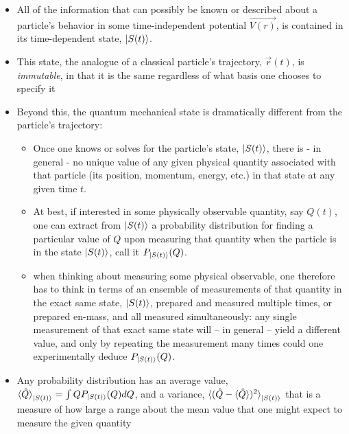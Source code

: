 \documentclass{article}
\begin{document}
\begin{itemize}
    \item All of the information that can possibly be known or described about a particle's behavior in some time-independent potential $\vec{V(r)}$, is contained in its time-dependent state, $\ket{S(t)}$. 
    
    \item This state, the analogue of a classical particle's trajectory, $\vec{r}(t)$, is \textit{immutable}, in that it is the same regardless of what basis one chooses to specify it
    
    \item Beyond this, the quantum mechanical state is dramatically different from the particle's trajectory:
    
    \begin{itemize}
        \item Once one knows or solves for the particle's state, $\ket{S(t)}$, there is - in general - no unique value of any given physical quantity associated with that particle (its position, momentum, energy, etc.) in that state at any given time $t$. 
        
        \item At best, if interested in some physically observable quantity, say $Q(t)$, one can extract from $\ket{S(t)}$ a probability distribution for finding a particular value of $Q$ upon measuring that quantity when the particle is in the state $\ket{S(t)}$, call it $P_{\ket{S(t)}}(Q)$. 
        
        \item when thinking about measuring some physical observable, one therefore has to think in terms of an ensemble of measurements of that quantity in the exact same state, $\ket{S(t)}$, prepared and measured multiple times, or prepared en-mass, and all measured simultaneously: any single measurement of that exact same state will – in general – yield a different value, and only by repeating the measurement many times could one experimentally deduce $P_{\ket{S(t)}}(Q)$. 
        
    \end{itemize}
    
    \item Any probability distribution has an average value, $\braket{\hat{Q}}_{\ket{S(t)}} = \int Q P_{\ket{S(t)}}(Q) dQ$, and a variance, $\braket{(\hat{Q} - \braket{\hat{Q}})^2}_{\ket{S(t)}}$ that is a measure of how large a range about the mean value that one might expect to measure the given quantity
    

\end{itemize}
\end{document}
